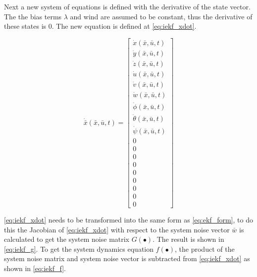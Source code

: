 Next a new system of equations is defined with the derivative of the state vector. The the bias terms $\lambda$ and wind are assumed to be constant, thus the derivative of these states is $0$. The new equation is defined at \autoref{eq:iekf_xdot}.


\begin{equation}
    \dot{\bar x} \left( {\bar x,\bar u,t} \right) = \left[ {\begin{array}{*{20}{c}}
        {\dot x\left( {\bar x,\bar u,t} \right)}\\
        {\dot y\left( {\bar x,\bar u,t} \right)}\\
        {\dot z\left( {\bar x,\bar u,t} \right)}\\
        {\dot u\left( {\bar x,\bar u,t} \right)}\\
        {\dot v\left( {\bar x,\bar u,t} \right)}\\
        {\dot w\left( {\bar x,\bar u,t} \right)}\\
        {\dot \phi \left( {\bar x,\bar u,t} \right)}\\
        {\dot \theta \left( {\bar x,\bar u,t} \right)}\\
        {\dot \psi \left( {\bar x,\bar u,t} \right)}\\
        0\\
        0\\
        0\\
        0\\
        0\\
        0\\
        0\\
        0\\
        0
        \end{array}} \right]
        \label{eq:iekf_xdot}
\end{equation}


\autoref{eq:iekf_xdot} needs to be transformed into the same form as \autoref{eq:ekf_form}, to do this the Jacobian of \autoref{eq:iekf_xdot} with respect to the system noise vector $\bar w$ is calculated to get the system noise matrix $G\left( \bullet \right)$. The result is shown in \autoref{eq:iekf_g}. To get the system dynamics equation $f(\bullet)$, the product of the system noise matrix and system noise vector is subtracted from \autoref{eq:iekf_xdot} as shown in \autoref{eq:iekf_f}. 

